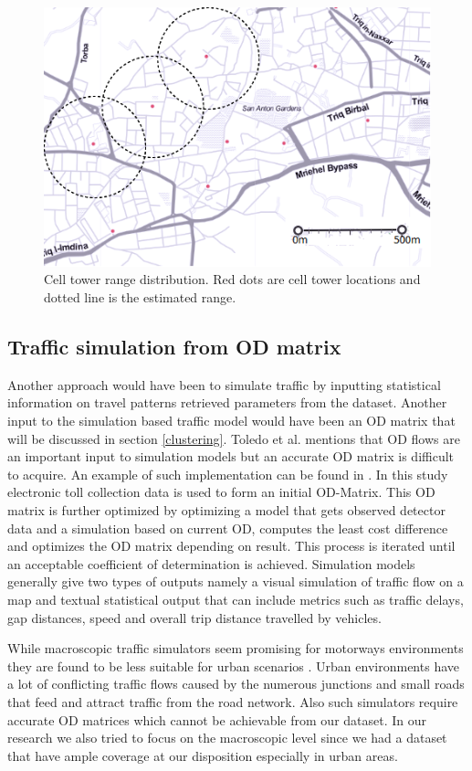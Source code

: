 \documentclass[12pt, a4paper]{report}
\theoremstyle{definition}
\theoremstyle{definition}%
\theoremstyle{definition}%
\theoremstyle{definition}%
\theoremstyle{definition}%
\theoremstyle{definition}%
\begin{document}
\begin{figure}[h]	
	\includegraphics[scale=0.75]{cell_towers_distribution}
	\centering
	\caption{Cell tower range distribution. Red dots are cell tower locations and dotted line is the estimated range.}
	\label{fig:cell_towers_distribution}
\end{figure}

\subsection{Traffic simulation from OD matrix}
Another approach would have been to simulate traffic by inputting statistical information on travel patterns retrieved parameters from the dataset. Another input to the simulation based traffic model would have been an OD matrix that will be discussed in section \ref{clustering}. Toledo et al. \cite{Toledo2004} mentions that OD flows are an important input to simulation models but an accurate OD matrix is difficult to acquire. An example of such implementation can be found in \cite{Hirai2015}. In this study electronic toll collection data is used to form an initial OD-Matrix. This OD matrix is further optimized by optimizing a model that gets observed detector data and a simulation based on current OD, computes the least cost difference and optimizes the OD matrix depending on result. This process is iterated until an acceptable coefficient of determination is achieved. Simulation models generally give two types of outputs namely a visual simulation of traffic flow on a map and textual statistical output that can include metrics such as traffic delays, gap distances, speed and overall trip distance travelled by vehicles.

While macroscopic traffic simulators seem promising for motorways environments they are found to be less suitable for urban scenarios \cite{Bazghandi2012}. Urban environments have a lot of conflicting traffic flows caused by the numerous junctions and small roads that feed and attract traffic from the road network. Also such simulators require accurate OD matrices which cannot be achievable from our dataset. In our research we also tried to focus on the macroscopic level since we had a dataset that have ample coverage at our disposition especially in urban areas.    
\end{document}
